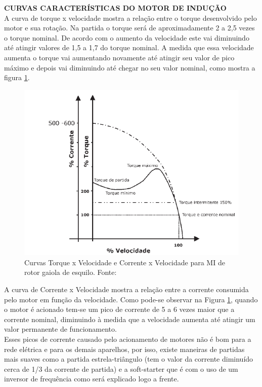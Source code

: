 \textbf{CURVAS CARACTERÍSTICAS DO MOTOR DE INDUÇÃO}\\

A curva de torque x velocidade mostra a relação entre o torque desenvolvido pelo motor e sua rotação. Na partida o torque será de aproximadamente 2 a 2,5 vezes o torque nominal. De acordo com o aumento da velocidade este vai diminuindo até atingir valores de 1,5 a 1,7 do torque nominal.\cite{WEG} A medida que essa velocidade aumenta o torque vai aumentando novamente até atingir seu valor de pico máximo e depois vai diminuindo até chegar no seu
valor nominal, como mostra a figura \ref{fig:curvas_motor}.

\begin{figure}[h!]
\centering
\includegraphics[scale=0.8]{figuras/grafico_motor.png}
\caption{Curvas Torque x Velocidade e Corrente x Velocidade para MI de rotor gaiola de esquilo. Fonte:\cite{WEG}}
\label{fig:curvas_motor}
\end{figure}

A curva de Corrente x Velocidade mostra a relação entre a corrente consumida pelo motor em função da velocidade. Como pode-se observar na Figura \ref{fig:curvas_motor}, quando o motor é acionado tem-se um pico de corrente de 5 a 6 vezes maior que a corrente nominal, diminuindo à medida que a velocidade aumenta até atingir um valor permanente de funcionamento.\\

\text Esses picos de corrente causado pelo acionamento de motores não é bom para a rede elétrica e para os demais aparelhos, por isso, existe maneiras de partidas mais suaves como a partida estrela-triângulo (tem o valor da corrente diminuído cerca de 1/3 da corrente de partida) e a soft-starter que é com o uso de um inversor de frequência como será explicado logo a frente.\\

